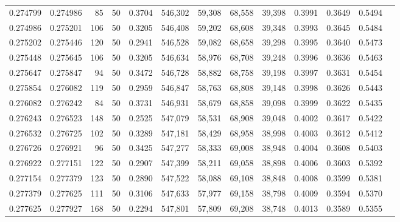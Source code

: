 \begin{tabular}{rrrrrrrrrrrrr}
0.274799 & 0.274986 &    85 &  50 &                                     0.3704 & 546,302 &  59,308 &  68,558 &  39,398 & 0.3991 & 0.3649 & 0.5494 \\
0.274986 & 0.275201 &   106 &  50 &                                     0.3205 & 546,408 &  59,202 &  68,608 &  39,348 & 0.3993 & 0.3645 & 0.5484 \\
0.275202 & 0.275446 &   120 &  50 &                                     0.2941 & 546,528 &  59,082 &  68,658 &  39,298 & 0.3995 & 0.3640 & 0.5473 \\
0.275448 & 0.275645 &   106 &  50 &                                     0.3205 & 546,634 &  58,976 &  68,708 &  39,248 & 0.3996 & 0.3636 & 0.5463 \\
0.275647 & 0.275847 &    94 &  50 &                                     0.3472 & 546,728 &  58,882 &  68,758 &  39,198 & 0.3997 & 0.3631 & 0.5454 \\
0.275854 & 0.276082 &   119 &  50 &                                     0.2959 & 546,847 &  58,763 &  68,808 &  39,148 & 0.3998 & 0.3626 & 0.5443 \\
0.276082 & 0.276242 &    84 &  50 &                                     0.3731 & 546,931 &  58,679 &  68,858 &  39,098 & 0.3999 & 0.3622 & 0.5435 \\
0.276243 & 0.276523 &   148 &  50 &                                     0.2525 & 547,079 &  58,531 &  68,908 &  39,048 & 0.4002 & 0.3617 & 0.5422 \\
0.276532 & 0.276725 &   102 &  50 &                                     0.3289 & 547,181 &  58,429 &  68,958 &  38,998 & 0.4003 & 0.3612 & 0.5412 \\
0.276726 & 0.276921 &    96 &  50 &                                     0.3425 & 547,277 &  58,333 &  69,008 &  38,948 & 0.4004 & 0.3608 & 0.5403 \\
0.276922 & 0.277151 &   122 &  50 &                                     0.2907 & 547,399 &  58,211 &  69,058 &  38,898 & 0.4006 & 0.3603 & 0.5392 \\
0.277154 & 0.277379 &   123 &  50 &                                     0.2890 & 547,522 &  58,088 &  69,108 &  38,848 & 0.4008 & 0.3599 & 0.5381 \\
0.277379 & 0.277625 &   111 &  50 &                                     0.3106 & 547,633 &  57,977 &  69,158 &  38,798 & 0.4009 & 0.3594 & 0.5370 \\
0.277625 & 0.277927 &   168 &  50 &                                     0.2294 & 547,801 &  57,809 &  69,208 &  38,748 & 0.4013 & 0.3589 & 0.5355 \\

\end{tabular}
